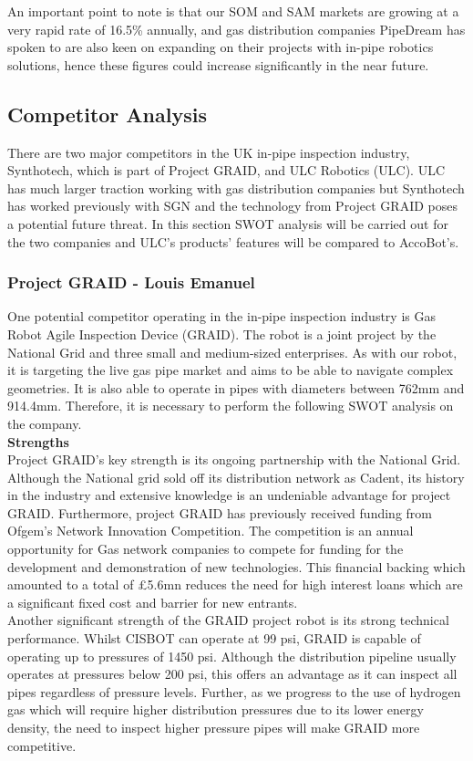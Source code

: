 \documentclass[11pt]{article}		%
\begin{document}
    An important point to note is that our SOM and SAM markets are growing at a very rapid rate of 16.5\% annually, and gas distribution companies PipeDream has spoken to are also keen on expanding on their projects with in-pipe robotics solutions, hence these figures could increase significantly in the near future. 
    \subsection{Competitor Analysis}
        There are two major competitors in the UK in-pipe inspection industry, Synthotech, which is part of Project GRAID, and ULC Robotics (ULC). ULC has much larger traction working with gas distribution companies but Synthotech has worked previously with SGN and the technology from Project GRAID poses a potential future threat. In this section SWOT analysis will be carried out for the two companies and ULC's products' features will be compared to AccoBot's.

		\subsubsection[Project GRAID]{Project GRAID - Louis Emanuel}
		
			One potential competitor operating in the in-pipe inspection industry is Gas Robot Agile Inspection Device (GRAID). The robot is a joint project by the National Grid and three small and medium-sized enterprises. As with our robot, it is targeting the live gas pipe market and aims to be able to navigate complex geometries. It is also able to operate in pipes with diameters between 762mm and 914.4mm. Therefore, it is necessary to perform the following SWOT analysis on the company. \\
			
			\textbf{Strengths} \\
			Project GRAID's key strength is its ongoing partnership with the National Grid. Although the National grid sold off its distribution network as Cadent, its history in the industry and extensive knowledge is an undeniable advantage for project GRAID. Furthermore, project GRAID has previously received funding from Ofgem's Network Innovation Competition. The competition is an annual opportunity for Gas network companies to compete for funding for the development and demonstration of new technologies. This financial backing which amounted to a total of £5.6mn reduces the need for high interest loans which are a significant fixed cost and barrier for new entrants. \\
		    \hspace*{3ex}Another significant strength of the GRAID project robot is its strong technical performance. Whilst CISBOT can operate at 99 psi, GRAID is capable of operating up to pressures of 1450 psi. Although the distribution pipeline usually operates at pressures below 200 psi, this offers an advantage as it can inspect all pipes regardless of pressure levels. Further, as we progress to the use of hydrogen gas which will require higher distribution pressures due to its lower energy density, the need to inspect higher pressure pipes will make GRAID more competitive. 
	        
\end{document}
